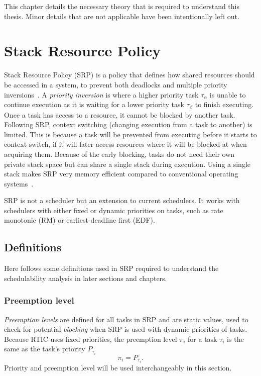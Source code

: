 This chapter details the necessary theory that is required to understand this thesis.
Minor details that are not applicable have been intentionally left out.

\section{Stack Resource Policy}\label{theory:srp}
Stack Resource Policy (SRP) is a policy that defines how shared resources
should be accessed in a system, to prevent both deadlocks and multiple priority
inversions~\cite{srp}. A \emph{priority inversion} is where a higher priority
task $\tau_\alpha$ is unable to continue execution as it is waiting for a lower
priority task $\tau_\beta$ to finish executing. Once a task has access to a
resource, it cannot be blocked by another task. Following SRP, context
switching (changing execution from a task to another) is limited. This is
because a task will be prevented from executing before it starts to context
switch, if it will later access resources where it will be blocked at when
acquiring them. Because of the early blocking, tasks do not need their own
private stack space but can share a single stack during execution. Using a
single stack makes SRP very memory efficient compared to conventional operating
systems~\cite{hardrealtimecomputingsystems}.

SRP is not a scheduler but an extension to current schedulers. It works with
schedulers with either fixed or dynamic priorities on tasks, such as rate
monotonic (RM) or earliest-deadline first (EDF).

\subsection{Definitions}\label{theory:srp:definitions}
Here follows some definitions used in SRP required to understand the
schedulability analysis in later sections and chapters.

\subsubsection{Preemption level}\label{theory:srp:definitions:preemption}
\emph{Preemption levels} are defined for all tasks in SRP and are static
values, used to check for potential \emph{blocking} when SRP is used with
dynamic priorities of tasks. Because RTIC uses fixed priorities, the
preemption level $\pi_i$ for a task $\tau_i$ is the same as the task's priority
$P_{\tau_i}$
\begin{equation}
    \pi_i = P_{\tau_i}.
\end{equation}
Priority and preemption level will be used interchangeably in this section.

